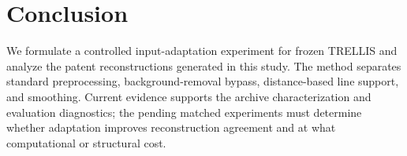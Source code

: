 \section{Conclusion}
We formulate a controlled input-adaptation experiment for frozen TRELLIS and
analyze the patent reconstructions generated in this study. The method separates standard
preprocessing, background-removal bypass, distance-based line support, and
smoothing. Current evidence supports the archive characterization and evaluation
diagnostics; the pending matched experiments must determine whether adaptation
improves reconstruction agreement and at what computational or structural cost.

